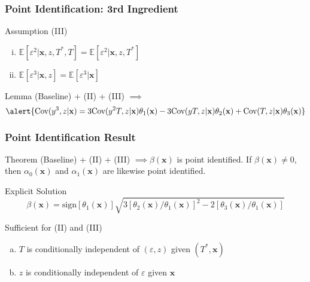 \documentclass[handout]{beamer}
\begin{document}
\begin{frame}
  \frametitle{Point Identification: 3rd Ingredient}

  \begin{block}{Assumption (III)}
    \begin{enumerate}[(i)]
    \item $\mathbb{E}[\varepsilon^2|\mathbf{x},z,T^*,T] = \mathbb{E}[\varepsilon^2|\mathbf{x},z, T^*]$
    \item $\mathbb{E}[\varepsilon^3|\mathbf{x},z] = \mathbb{E}[\varepsilon^3|\mathbf{x}]$
  \end{enumerate}
  \end{block}
 
  \begin{block}{Lemma}
    (Baseline) + (II) + (III) $\implies$ 
  \small
\[
  \alert{\mbox{Cov}(y^3,z|\mathbf{x}) = 3 \mbox{Cov}(y^2T,z|\mathbf{x}) \theta_1(\mathbf{x}) -3\mbox{Cov}(yT,z|\mathbf{x}) \theta_2(\mathbf{x}) + \mbox{Cov}(T,z|\mathbf{x}) \theta_3(\mathbf{x})}
\]
\end{block}
\end{frame}
\begin{frame}
  \frametitle{Point Identification Result}

  \small 

  \begin{alertblock}{Theorem}
    (Baseline) + (II) + (III) $\implies \beta(\mathbf{x})$ is point identified.
    If $\beta(\mathbf{x}) \neq 0$, then $\alpha_0(\mathbf{x})$ and $\alpha_1(\mathbf{x})$ are likewise point identified.
  \end{alertblock}

\vspace{1em}

  \begin{block}{Explicit Solution}
\vspace{-1em}
    \[
      \beta(\mathbf{x}) = \mbox{sign}\left[ \theta_1(\mathbf{x}) \right] \sqrt{3\left[ \theta_2(\mathbf{x})/\theta_1(\mathbf{x}) \right]^2 - 2\left[ \theta_3(\mathbf{x})/\theta_1(\mathbf{x}) \right]} 
    \]

  \end{block}

\vspace{1em}

  \begin{block}{Sufficient for (II) and (III)}
    \vspace{-0.5em}
    \begin{enumerate}[(a)]
      \item $T$ is conditionally independent of $(\varepsilon,z)$ given $(T^*,\mathbf{x})$
      \item $z$ is conditionally independent of $\varepsilon$ given $\mathbf{x}$
    \end{enumerate}
  \end{block}
\end{frame}
\end{document}
